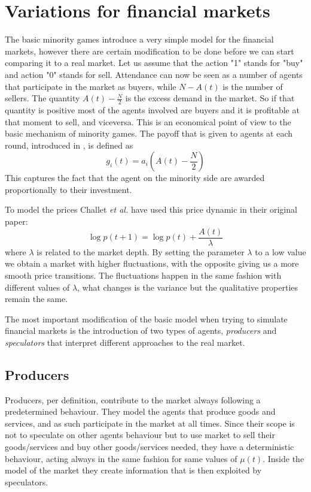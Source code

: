 \section{Variations for financial markets}
\label{minority:variations}

The basic minority games introduce a very simple model for the financial markets, however there are certain modification to be done before we can start comparing it to a real market.
Let us assume that the action "1" stands for "buy" and action "0" stands for sell.
Attendance can now be seen as a number of agents that participate in the market as buyers, while $N-A(t)$ is the number of sellers.
The quantity $A(t)-\frac{N}{2}$ is the excess demand in the market.
So if that quantity is positive most of the agents involved are buyers and it is profitable at that moment to sell, and viceversa.
This is an economical point of view to the basic mechanism of minority games.
The payoff that is given to agents at each round, introduced in \cite{challet2001stylized}, is defined as
\begin{displaymath}
g_i(t)=a_i(A(t) - \frac{N}{2})
\end{displaymath}
This captures the fact that the agent on the minority side are awarded proportionally to their investment.

To model the prices Challet \textit{et al.} have used this price dynamic in their original paper:
\begin{displaymath}
\log p(t+1) = \log p(t) + \frac{A(t)}{\lambda}
\end{displaymath}
where $\lambda$ is related to the market depth.
By setting the parameter $\lambda$ to a low value we obtain a market with higher fluctuations, with the opposite giving us a more smooth price transitions.
The fluctuations happen in the same fashion with different values of $\lambda$, what changes is the variance but the qualitative properties remain the same.

The most important modification of the basic model when trying to simulate financial markets is the introduction of two types of agents, \textit{producers} and \textit{speculators} that interpret different approaches to the real market.

\subsection{Producers}

Producers, per definition, contribute to the market always following a predetermined behaviour.
They model the agents that produce goods and services, and as such participate in the market at all times.
Since their scope is not to speculate on other agents behaviour but to use market to sell their goods/services and buy other goods/services needed, they have a deterministic behaviour, acting always in the same fashion for same values of $\mu(t)$.
Inside the model of the market they create information that is then exploited by speculators.

